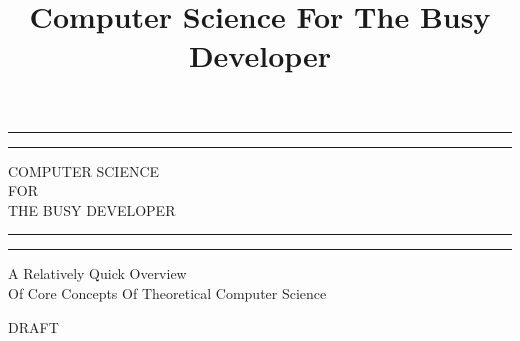 \documentclass[12pt, a4paper, justified, notitlepage, sfsidenotes, notoc]{book}
\date{}
\title{Computer Science For The Busy Developer}
\begin{document}
\begin{titlepage}
\begin{fullwidth} %

	\centering %

	\scshape %

	\vspace*{\baselineskip} %


	\rule{\textwidth}{1.6pt}\vspace*{-\baselineskip}\vspace*{2pt} %
	\rule{\textwidth}{0.4pt} %

	\vspace{0.75\baselineskip} %

	{\LARGE COMPUTER SCIENCE\\ FOR\\ THE BUSY DEVELOPER\\} %

	\vspace{0.75\baselineskip} %

	\rule{\textwidth}{0.4pt}\vspace*{-\baselineskip}\vspace{3.2pt} %
	\rule{\textwidth}{1.6pt} %

	\vspace{2\baselineskip} %


  A Relatively Quick Overview\\ Of Core Concepts Of Theoretical Computer Science

	\vspace*{3\baselineskip} %


	DRAFT

	\vspace{0.5\baselineskip} %


\end{fullwidth}
\end{titlepage}
\end{document}
